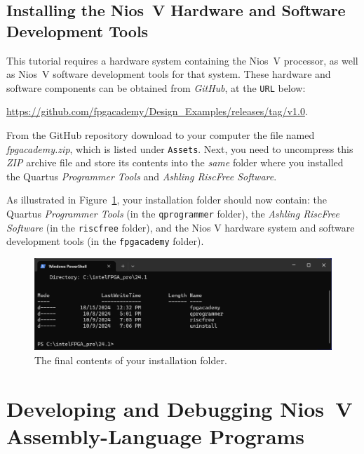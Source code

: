 \documentclass[11pt, twoside, pdftex]{article}
\begin{document}
\subsection{Installing the Nios~V Hardware and Software Development Tools}
\label{sec:hw_sw}

This tutorial requires a hardware system containing the Nios~V processor, as well as Nios~V
software development tools for that system. These hardware and software components can be
obtained from {\it GitHub}, at the \texttt{URL} below:

{\href{https://github.com/fpgacademy/Design\_Examples/releases/tag/v1.0} 
{https://github.com/fpgacademy/Design\_Examples/releases/tag/v1.0}}.

From the GitHub repository download to your computer the file named {\it fpgacademy.zip}, 
which is listed under \texttt{Assets}. Next, you need to uncompress this {\it ZIP} archive 
file and store its contents into the {\it same} folder where you installed the Quartus 
{\it Programmer Tools} and {\it Ashling RiscFree Software}.

As illustrated in Figure~\ref{fig:goterdone}, your installation folder should now 
contain: the Quartus {\it Programmer Tools} (in the \texttt{qprogrammer} folder), the 
{\it Ashling RiscFree Software} (in the \texttt{riscfree} folder), and the Nios V 
hardware system and software development tools (in the \texttt{fpgacademy} folder).
~\\
\begin{figure}[h]
    \begin{center}
        \includegraphics[width=.9\linewidth]{figures/goterdone.png}
        \caption{The final contents of your installation folder.}
        \label{fig:goterdone}
    \end{center}
\end{figure}

\section{Developing and Debugging Nios~V Assembly-Language Programs}
\label{sec:assembly}
\end{document}
